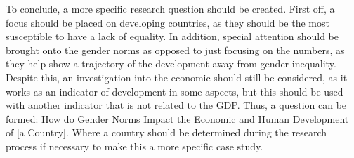 \documentclass[12pt, letterpaper]{article}
\begin{document}
To conclude, a more specific research question should be created. First off, a focus should be placed on developing countries, as they should be the most susceptible to have a lack of equality. In addition, special attention should be brought onto the gender norms as opposed to just focusing on the numbers, as they help show a trajectory of the development away from gender inequality. Despite this, an investigation into the economic should still be considered, as it works as an indicator of development in some aspects, but this should be used with another indicator that is not related to the GDP. Thus, a question can be formed: How do Gender Norms Impact the Economic and Human Development of [a Country]. Where a country should be determined during the research process if necessary to make this a more specific case study. 
\newpage


\end{document}
